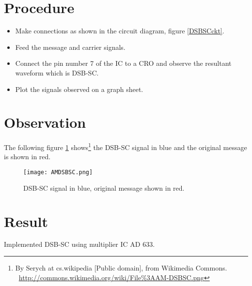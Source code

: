 \section*{Procedure}
\begin{itemize}
\item
Make connections as shown in the circuit diagram, figure \ref{DSBSCckt}.
\item
Feed the message and carrier signals.
\item
Connect the pin number 7 of the IC to a CRO and observe the resultant waveform which is DSB-SC.
\item

Plot the signals observed on a graph sheet.
\end{itemize}
\section*{Observation}

The following figure \ref{DSBSC} shows\footnote{By Serych at cs.wikipedia [Public domain], from Wikimedia Commons.  \ \url{http://commons.wikimedia.org/wiki/File\%3AAM-DSBSC.png}} the DSB-SC signal in blue and the original message is shown in red.
\begin{figure}[h]
\begin{center}
\texttt{[image: AMDSBSC.png]}
\caption{DSB-SC signal in blue, original message shown in red.}
\label{DSBSC}
\end{center}

\end{figure}


\section*{Result}
Implemented DSB-SC using multiplier IC AD 633.